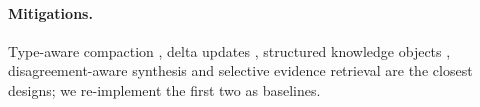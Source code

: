 \paragraph{Mitigations.}
Type-aware compaction \citep{zerhoudi2026compaction}, delta updates \citep{zhang2026ace}, structured knowledge objects \citep{zahn2026facts}, disagreement-aware synthesis \citep{mishra-etal-2026-beyond} and selective evidence retrieval \citep{min-song-2026-dont,jung2026cdic} are the closest designs; we re-implement the first two as baselines.
